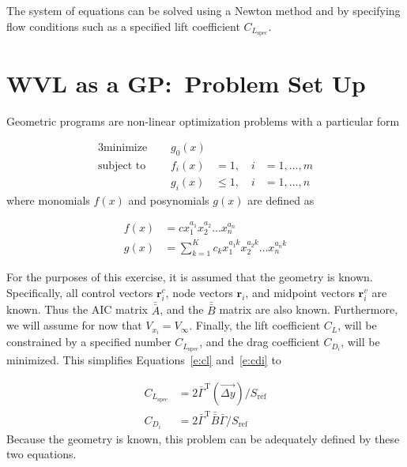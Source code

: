 \documentclass[10pt, a4paper]{article}
\begin{document}
The system of equations can be solved using a Newton method and by specifying flow conditions such as a specified lift coefficient $C_{L_{\mathrm{spec}}}$.


\section*{WVL as a GP:\ Problem Set Up}

Geometric programs are non-linear optimization problems with a particular form

\begin{alignat*}{3}
    \text{minimize }\quad & g_0 (x) && \\
    \text{subject to }\quad & f_i(x) &= 1,\quad  i&=1,\dots,m \\
                            & g_i(x) &\leq 1, \quad i&=1,\dots,n 
\end{alignat*}
where monomials $f(x)$ and posynomials $g(x)$ are defined as

\begin{align}
    f(x) &= cx_1^{a_1}x_2^{a_2}  \dots x_n^{a_n}  \\
    g(x) &= \sum_{k=1}^K c_k x_1^{a_1k}x_2^{a_2k}  \dots x_n^{a_nk}
\end{align}

For the purposes of this exercise, it is assumed that the geometry is known.  
Specifically, all control vectors $\mathbf{r}_i^c$, node vectors $\mathbf{r}_i$, and midpoint vectors $\mathbf{r}_i^v$ are known.  Thus the AIC matrix $\bar{\bar{A}}$, and the $\bar{\bar{B}}$ matrix are also known.  
Furthermore, we will assume for now that $V_{x_i} = V_{\infty}$.  
Finally, the lift coefficient $C_L$, will be constrained by a specified number $C_{L_{\mathrm{spec}}}$, and the drag coefficient $C_{D_i}$, will be minimized.
This simplifies Equations~\ref{e:cl} and~\ref{e:cdi} to 

\begin{align}
    \label{e:clsp}
    C_{L_{\mathrm{spec}}} &= 2 \bar{\Gamma}^{\mathrm{T}} (\vec{\Delta y})/S_{\mathrm{ref}} \\
    \label{e:cdsp}
    C_{D_i} &= 2 \bar{\Gamma}^{\mathrm{T}} \bar{\bar{B}} \bar{\Gamma}/S_{\mathrm{ref}} 
\end{align}
Because the geometry is known, this problem can be adequately defined by these two equations. 
\end{document}
